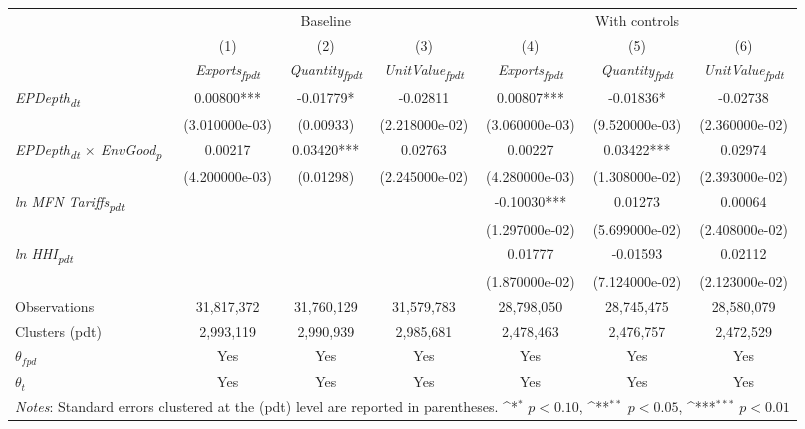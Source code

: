 {
\def\sym#1{\ifmmode^{#1}\else\(^{#1}\)\fi}
\begin{tabular}{l*{6}{c}}
\toprule
                &\multicolumn{3}{c}{Baseline}                            &\multicolumn{3}{c}{With controls}                       \\\cmidrule(lr){2-4}\cmidrule(lr){5-7}
                &\multicolumn{1}{c}{(1)}&\multicolumn{1}{c}{(2)}&\multicolumn{1}{c}{(3)}&\multicolumn{1}{c}{(4)}&\multicolumn{1}{c}{(5)}&\multicolumn{1}{c}{(6)}\\
                &\multicolumn{1}{c}{\textit{Exports\textsubscript{fpdt}}}&\multicolumn{1}{c}{\textit{Quantity\textsubscript{fpdt}}}&\multicolumn{1}{c}{\textit{UnitValue\textsubscript{fpdt}}}&\multicolumn{1}{c}{\textit{Exports\textsubscript{fpdt}}}&\multicolumn{1}{c}{\textit{Quantity\textsubscript{fpdt}}}&\multicolumn{1}{c}{\textit{UnitValue\textsubscript{fpdt}}}\\
\midrule
\textit{EPDepth\textsubscript{dt}} & 0.00800*** & -0.01779* & -0.02811 & 0.00807*** & -0.01836* & -0.02738\\
 & (3.010000e-03) & (0.00933) & (2.218000e-02) & (3.060000e-03) & (9.520000e-03) & (2.360000e-02)\\
\addlinespace
\textit{EPDepth\textsubscript{dt} $\times$ EnvGood\textsubscript{p}} & 0.00217 & 0.03420*** & 0.02763 & 0.00227 & 0.03422*** & 0.02974\\
 & (4.200000e-03) & (0.01298) & (2.245000e-02) & (4.280000e-03) & (1.308000e-02) & (2.393000e-02)\\
\addlinespace
\textit{ln MFN Tariffs\textsubscript{pdt}} &  &  &  & -0.10030*** & 0.01273 & 0.00064\\
 &  &  &  & (1.297000e-02) & (5.699000e-02) & (2.408000e-02)\\
\addlinespace
\textit{ln HHI\textsubscript{pdt}} &  &  &  & 0.01777 & -0.01593 & 0.02112\\
 &  &  &  & (1.870000e-02) & (7.124000e-02) & (2.123000e-02)\\
\addlinespace
\midrule
\midrule
Observations & 31,817,372 & 31,760,129 & 31,579,783 & 28,798,050 & 28,745,475 & 28,580,079\\
Clusters (pdt) & 2,993,119 & 2,990,939 & 2,985,681 & 2,478,463 & 2,476,757 & 2,472,529\\
$\theta_{fpd}$ & Yes & Yes & Yes & Yes & Yes & Yes\\
$\theta_t$ & Yes & Yes & Yes & Yes & Yes & Yes\\
\bottomrule
\multicolumn{7}{l}{\footnotesize \textit{Notes}: Standard errors clustered at the (pdt) level are reported in parentheses. \sym{*} \(p<0.10\), \sym{**} \(p<0.05\), \sym{***} \(p<0.01\)}\\
\end{tabular}
}
